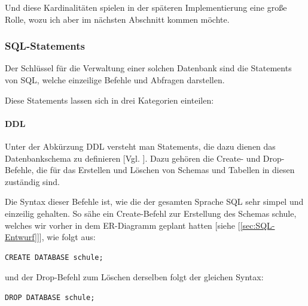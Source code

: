 \documentclass[12pt,a4paper,bibliography=totocnumbered,listof=totocnumbered]{scrartcl}
\begin{document}
\begin{minipage}{\linewidth}
Und diese Kardinalitäten spielen in der späteren Implementierung eine große Rolle, wozu ich aber im nächsten Abschnitt kommen möchte.



\subsubsection{SQL-Statements}
Der Schlüssel für die Verwaltung einer solchen Datenbank sind die \glqq Statements\grqq{} von SQL, welche einzeilige Befehle und Abfragen darstellen. 


Diese Statements lassen sich in drei Kategorien einteilen:
\paragraph{DDL}

Unter der Abkürzung DDL versteht man Statements, die dazu dienen das Datenbankschema zu definieren [Vgl. \cite{wiki/SQL}].
Dazu gehören die \glqq Create-\grqq{} und \glqq Drop-Befehle\grqq{}, die für das Erstellen und Löschen von Schemas und Tabellen in diesen zuständig sind.

Die Syntax dieser Befehle ist, wie die der gesamten Sprache SQL sehr simpel und einzeilig gehalten.
So sähe ein \glqq Create-Befehl\grqq{} zur Erstellung des Schemas \glqq schule\grqq{}, welches wir vorher in dem ER-Diagramm geplant hatten [siehe [\ref{sec:SQL-Entwurf}]], wie folgt aus:
\\
\vspace{1em}
\begin{lstlisting}[caption=SQL Create Schema, label=lst:sql-create-schema]
CREATE DATABASE schule;
\end{lstlisting}

und der \glqq Drop-Befehl\grqq{} zum Löschen derselben folgt der gleichen Syntax:
\\
\vspace{1em}
\begin{lstlisting}[caption= SQL Drop Schema, label=lst:sql-drop-schema]
DROP DATABASE schule;
\end{lstlisting}


\end{minipage}
\end{document}
